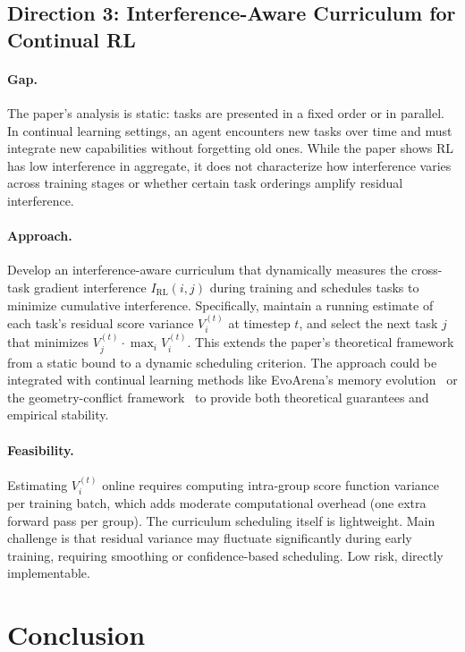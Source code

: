 \documentclass[11pt,a4paper]{article}
\begin{document}
\subsection{Direction 3: Interference-Aware Curriculum for Continual RL}

\paragraph{Gap.} The paper's analysis is static: tasks are presented in a fixed order or in parallel. In continual learning settings, an agent encounters new tasks over time and must integrate new capabilities without forgetting old ones. While the paper shows RL has low interference in aggregate, it does not characterize how interference varies across training stages or whether certain task orderings amplify residual interference.

\paragraph{Approach.} Develop an interference-aware curriculum that dynamically measures the cross-task gradient interference $I_{\text{RL}}(i,j)$ during training and schedules tasks to minimize cumulative interference. Specifically, maintain a running estimate of each task's residual score variance $V_i^{(t)}$ at timestep $t$, and select the next task $j$ that minimizes $V_j^{(t)} \cdot \max_i V_i^{(t)}$. This extends the paper's theoretical framework from a static bound to a dynamic scheduling criterion. The approach could be integrated with continual learning methods like EvoArena's memory evolution~\cite{evoarena2026} or the geometry-conflict framework~\cite{geoconflict2026} to provide both theoretical guarantees and empirical stability.

\paragraph{Feasibility.} Estimating $V_i^{(t)}$ online requires computing intra-group score function variance per training batch, which adds moderate computational overhead (one extra forward pass per group). The curriculum scheduling itself is lightweight. Main challenge is that residual variance may fluctuate significantly during early training, requiring smoothing or confidence-based scheduling. Low risk, directly implementable.

\section{Conclusion}
\end{document}
